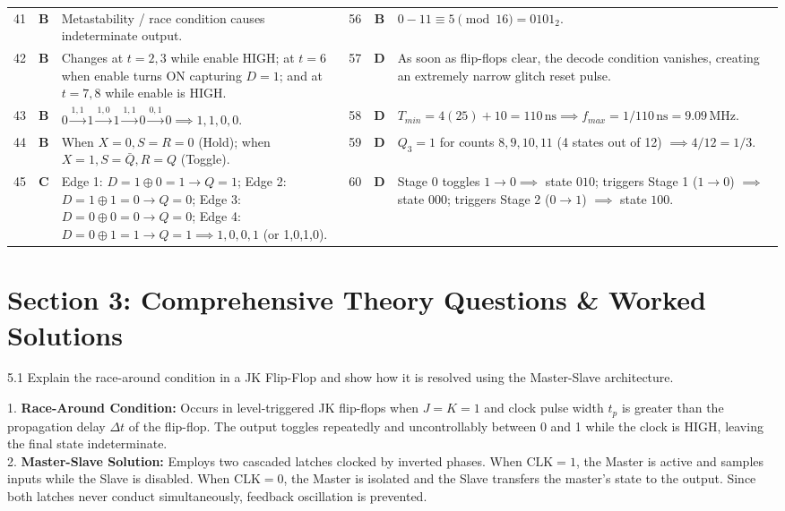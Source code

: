 \begin{table}[htbp]
\begin{tabularx}{\textwidth}{l c X l c X}
41 & \textbf{B} & Metastability / race condition causes indeterminate output. & 56 & \textbf{B} & $0 - 11 \equiv 5 \pmod{16} = 0101_2$. \\
42 & \textbf{B} & Changes at $t=2,3$ while enable HIGH; at $t=6$ when enable turns ON capturing $D=1$; and at $t=7,8$ while enable is HIGH. & 57 & \textbf{D} & As soon as flip-flops clear, the decode condition vanishes, creating an extremely narrow glitch reset pulse. \\
43 & \textbf{B} & $0 \xrightarrow{1,1} 1 \xrightarrow{1,0} 1 \xrightarrow{1,1} 0 \xrightarrow{0,1} 0 \implies 1, 1, 0, 0$. & 58 & \textbf{D} & $T_{min} = 4(25) + 10 = 110\,\text{ns} \implies f_{max} = 1/110\,\text{ns} = 9.09\,\text{MHz}$. \\
44 & \textbf{B} & When $X=0, S=R=0$ (Hold); when $X=1, S=\bar{Q}, R=Q$ (Toggle). & 59 & \textbf{D} & $Q_3=1$ for counts $8, 9, 10, 11$ (4 states out of 12) $\implies 4/12 = 1/3$. \\
45 & \textbf{C} & Edge 1: $D = 1\oplus 0 = 1 \to Q=1$; Edge 2: $D = 1\oplus 1 = 0 \to Q=0$; Edge 3: $D = 0\oplus 0 = 0 \to Q=0$; Edge 4: $D = 0\oplus 1 = 1 \to Q=1 \implies 1, 0, 0, 1$ (or 1,0,1,0). & 60 & \textbf{D} & Stage 0 toggles $1\to 0 \implies$ state $010$; triggers Stage 1 ($1\to 0$) $\implies$ state $000$; triggers Stage 2 ($0\to 1$) $\implies$ state $100$. \\
\bottomrule
\end{tabularx}
\end{table}

\newpage
\section{Section 3: Comprehensive Theory Questions \& Worked Solutions}
\begin{theoryq}{5.1}
Explain the race-around condition in a JK Flip-Flop and show how it is resolved using the Master-Slave architecture.
\end{theoryq}

\begin{theorysol}
1. \textbf{Race-Around Condition:} Occurs in level-triggered JK flip-flops when $J=K=1$ and clock pulse width $t_p$ is greater than the propagation delay $\Delta t$ of the flip-flop. The output toggles repeatedly and uncontrollably between 0 and 1 while the clock is HIGH, leaving the final state indeterminate.\\
2. \textbf{Master-Slave Solution:} Employs two cascaded latches clocked by inverted phases. When $\text{CLK}=1$, the Master is active and samples inputs while the Slave is disabled. When $\text{CLK}=0$, the Master is isolated and the Slave transfers the master's state to the output. Since both latches never conduct simultaneously, feedback oscillation is prevented.
\end{theorysol}

\vspace{3mm}

